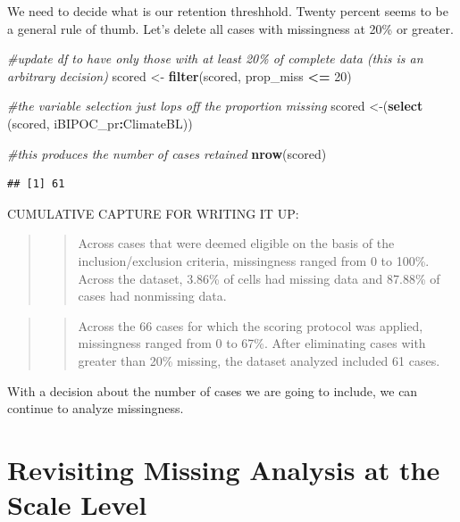 \documentclass[
  11pt,
]{book}
\newenvironment{Shaded}{\begin{snugshade}}{\end{snugshade}}
\newcommand{\CommentTok}[1]{\textcolor[rgb]{0.37,0.37,0.37}{\textit{#1}}}
\newcommand{\DecValTok}[1]{\textcolor[rgb]{0.06,0.06,0.06}{#1}}
\newcommand{\FunctionTok}[1]{\textcolor[rgb]{0.27,0.27,0.27}{\textbf{#1}}}
\newcommand{\NormalTok}[1]{#1}
\newcommand{\OtherTok}[1]{\textcolor[rgb]{0.37,0.37,0.37}{#1}}
\newcommand{\SpecialCharTok}[1]{\textcolor[rgb]{0.43,0.43,0.43}{\textbf{#1}}}
\begin{document}
We need to decide what is our retention threshhold. Twenty percent seems to be a general rule of thumb. Let's delete all cases with missingness at 20\% or greater.

\begin{Shaded}
\begin{Highlighting}[]
\CommentTok{\#update df to have only those with at least 20\% of complete data (this is an arbitrary decision)}
\NormalTok{scored }\OtherTok{\textless{}{-}} \FunctionTok{filter}\NormalTok{(scored, prop\_miss }\SpecialCharTok{\textless{}=} \DecValTok{20}\NormalTok{) }

\CommentTok{\#the variable selection just lops off the proportion missing}
\NormalTok{scored }\OtherTok{\textless{}{-}}\NormalTok{(}\FunctionTok{select}\NormalTok{ (scored, iBIPOC\_pr}\SpecialCharTok{:}\NormalTok{ClimateBL)) }

\CommentTok{\#this produces the number of cases retained}
\FunctionTok{nrow}\NormalTok{(scored)}
\end{Highlighting}
\end{Shaded}

\begin{verbatim}
## [1] 61
\end{verbatim}

CUMULATIVE CAPTURE FOR WRITING IT UP:

\begin{quote}
\begin{quote}
Across cases that were deemed eligible on the basis of the inclusion/exclusion criteria, missingness ranged from 0 to 100\%. Across the dataset, 3.86\% of cells had missing data and 87.88\% of cases had nonmissing data.
\end{quote}
\end{quote}

\begin{quote}
\begin{quote}
Across the 66 cases for which the scoring protocol was applied, missingness ranged from 0 to 67\%. After eliminating cases with greater than 20\% missing, the dataset analyzed included 61 cases.
\end{quote}
\end{quote}

With a decision about the number of cases we are going to include, we can continue to analyze missingness.

\hypertarget{revisiting-missing-analysis-at-the-scale-level}{%
\section{Revisiting Missing Analysis at the Scale Level}\label{revisiting-missing-analysis-at-the-scale-level}}
\end{document}
